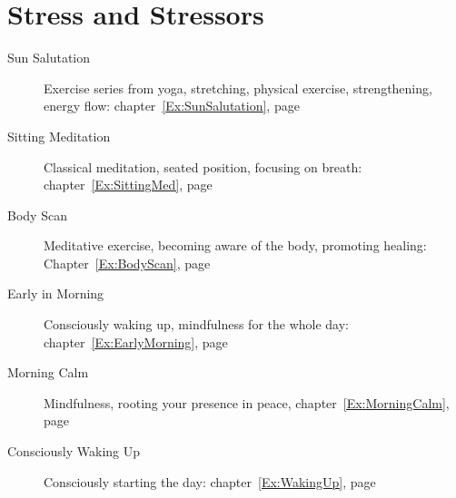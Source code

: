 \documentclass[../main.tex]{subfiles}
\begin{document}
%
\section{Stress and Stressors}

\begin{description}
\item[Sun Salutation] Exercise series from yoga, stretching, physical exercise, strengthening, energy flow:  chapter~\ref{Ex:SunSalutation}, page~\pageref{Ex:SunSalutation}
\item[Sitting Meditation] Classical meditation, seated position, focusing on breath: chapter~\ref{Ex:SittingMed}, page~\pageref{Ex:SittingMed}
\item[Body Scan] Meditative exercise, becoming aware of the body, promoting healing: Chapter~\ref{Ex:BodyScan}, page~\pageref{Ex:BodyScan}
  \item[Early in Morning] Consciously waking up, mindfulness for the whole day: chapter~\ref{Ex:EarlyMorning}, page~\pageref{Ex:EarlyMorning}
  \item[Morning Calm] Mindfulness, rooting your presence in peace, chapter~\ref{Ex:MorningCalm}, page~\pageref{Ex:MorningCalm}
    \item[Consciously Waking Up] Consciously starting the day: chapter~\ref{Ex:WakingUp}, page~\pageref{Ex:WakingUp}
  \end{description}
\end{document}
